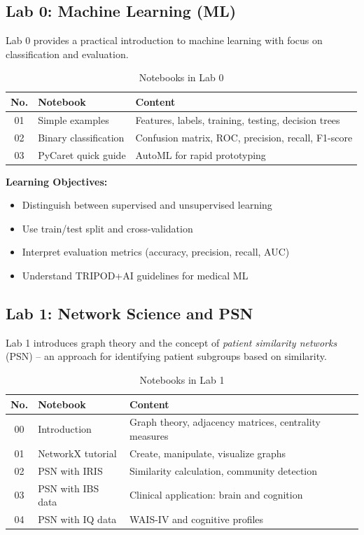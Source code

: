 \documentclass[11pt,a4paper]{article}
\begin{document}
\subsection{Lab 0: Machine Learning (ML)}

Lab 0 provides a practical introduction to machine learning with focus on classification and evaluation.

\begin{table}[htbp]
\centering
\caption{Notebooks in Lab 0}
\label{tab:lab0}
\begin{tabular}{@{}clp{7cm}@{}}
\toprule
\textbf{No.} & \textbf{Notebook} & \textbf{Content} \\
\midrule
01 & Simple examples & Features, labels, training, testing, decision trees \\
02 & Binary classification & Confusion matrix, ROC, precision, recall, F1-score \\
03 & PyCaret quick guide & AutoML for rapid prototyping \\
\bottomrule
\end{tabular}
\end{table}

\textbf{Learning Objectives:}
\begin{itemize}[nosep]
    \item Distinguish between supervised and unsupervised learning
    \item Use train/test split and cross-validation
    \item Interpret evaluation metrics (accuracy, precision, recall, AUC)
    \item Understand TRIPOD+AI guidelines for medical ML \citep{collins2024tripodai}
\end{itemize}

\subsection{Lab 1: Network Science and PSN}

Lab 1 introduces graph theory and the concept of \emph{patient similarity networks} (PSN) -- an approach for identifying patient subgroups based on similarity.

\begin{table}[htbp]
\centering
\caption{Notebooks in Lab 1}
\label{tab:lab1}
\begin{tabular}{@{}clp{6.5cm}@{}}
\toprule
\textbf{No.} & \textbf{Notebook} & \textbf{Content} \\
\midrule
00 & Introduction & Graph theory, adjacency matrices, centrality measures \\
01 & NetworkX tutorial & Create, manipulate, visualize graphs \\
02 & PSN with IRIS & Similarity calculation, community detection \\
03 & PSN with IBS data & Clinical application: brain and cognition \\
04 & PSN with IQ data & WAIS-IV and cognitive profiles \\
\bottomrule
\end{tabular}
\end{table}
\end{document}
